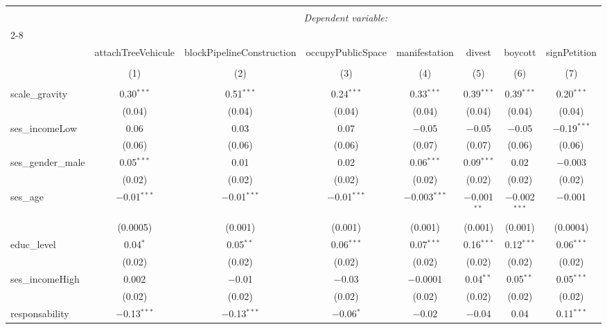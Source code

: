 \documentclass[
]{article}
\begin{document}
\begin{sidewaystable}[!htbp] \centering 
  \caption{Interaction pauvreté-préoccupations 2} 
  \label{} 
\begin{tabular}{@{\extracolsep{1pt}}lccccccc} 
\\[-1.8ex]\hline 
\hline \\[-1.8ex] 
 & \multicolumn{7}{c}{\textit{Dependent variable:}} \\ 
\cline{2-8} 
\\[-1.8ex] & attachTreeVehicule & blockPipelineConstruction & occupyPublicSpace & manifestation & divest & boycott & signPetition \\ 
\\[-1.8ex] & (1) & (2) & (3) & (4) & (5) & (6) & (7)\\ 
\hline \\[-1.8ex] 
 scale\_gravity & 0.30$^{***}$ & 0.51$^{***}$ & 0.24$^{***}$ & 0.33$^{***}$ & 0.39$^{***}$ & 0.39$^{***}$ & 0.20$^{***}$ \\ 
  & (0.04) & (0.04) & (0.04) & (0.04) & (0.04) & (0.04) & (0.04) \\ 
  ses\_incomeLow & 0.06 & 0.03 & 0.07 & $-$0.05 & $-$0.05 & $-$0.05 & $-$0.19$^{***}$ \\ 
  & (0.06) & (0.06) & (0.06) & (0.07) & (0.07) & (0.06) & (0.06) \\ 
  ses\_gender\_male & 0.05$^{***}$ & 0.01 & 0.02 & 0.06$^{***}$ & 0.09$^{***}$ & 0.02 & $-$0.003 \\ 
  & (0.02) & (0.02) & (0.02) & (0.02) & (0.02) & (0.02) & (0.02) \\ 
  ses\_age & $-$0.01$^{***}$ & $-$0.01$^{***}$ & $-$0.01$^{***}$ & $-$0.003$^{***}$ & $-$0.001$^{**}$ & $-$0.002$^{***}$ & $-$0.001 \\ 
  & (0.0005) & (0.001) & (0.001) & (0.001) & (0.001) & (0.001) & (0.0004) \\ 
  educ\_level & 0.04$^{*}$ & 0.05$^{**}$ & 0.06$^{***}$ & 0.07$^{***}$ & 0.16$^{***}$ & 0.12$^{***}$ & 0.06$^{***}$ \\ 
  & (0.02) & (0.02) & (0.02) & (0.02) & (0.02) & (0.02) & (0.02) \\ 
  ses\_incomeHigh & 0.002 & $-$0.01 & $-$0.03 & $-$0.0001 & 0.04$^{**}$ & 0.05$^{**}$ & 0.05$^{***}$ \\ 
  & (0.02) & (0.02) & (0.02) & (0.02) & (0.02) & (0.02) & (0.02) \\ 
  responsability & $-$0.13$^{***}$ & $-$0.13$^{***}$ & $-$0.06$^{*}$ & $-$0.02 & $-$0.04 & 0.04 & 0.11$^{***}$ \\ 

\end{tabular}
\end{sidewaystable}
\end{document}
